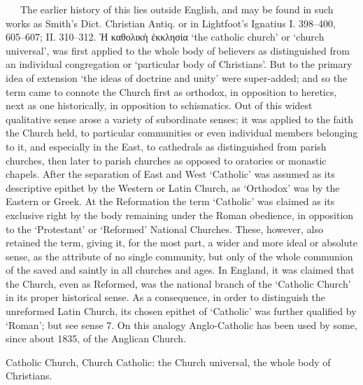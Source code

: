 \begin{description}[wide, labelwidth=!, labelindent=0pt]
\begin{myenumerate}
   The earlier history of this lies outside English, and may be found in such works as Smith's Dict. Christian Antiq. or in Lightfoot's Ignatius I. 398–400, 605–607; II. 310–312. Ἡ καθολικὴ ἐκκλησία ‘the catholic church’ or ‘church universal’, was first applied to the whole body of believers as distinguished from an individual congregation or ‘particular body of Christians’. But to the primary idea of extension ‘the ideas of doctrine and unity’ were super-added; and so the term came to connote the Church first as orthodox, in opposition to heretics, next as one historically, in opposition to schismatics. Out of this widest qualitative sense arose a variety of subordinate senses; it was applied to the faith the Church held, to particular communities or even individual members belonging to it, and especially in the East, to cathedrals as distinguished from parish churches, then later to parish churches as opposed to oratories or monastic chapels. After the separation of East and West ‘Catholic’ was assumed as its descriptive epithet by the Western or Latin Church, as ‘Orthodox’ was by the Eastern or Greek. At the Reformation the term ‘Catholic’ was claimed as its exclusive right by the body remaining under the Roman obedience, in opposition to the ‘Protestant’ or ‘Reformed’ National Churches. These, however, also retained the term, giving it, for the most part, a wider and more ideal or absolute sense, as the attribute of no single community, but only of the whole communion of the saved and saintly in all churches and ages. In England, it was claimed that the Church, even as Reformed, was the national branch of the ‘Catholic Church’ in its proper historical sense. As a consequence, in order to distinguish the unreformed Latin Church, its chosen epithet of ‘Catholic’ was further qualified by ‘Roman’; but see sense 7. On this analogy Anglo-Catholic has been used by some, since about 1835, of the Anglican Church.

 Catholic Church, Church Catholic: the Church universal, the whole body of Christians.


\end{myenumerate}
\end{description}
